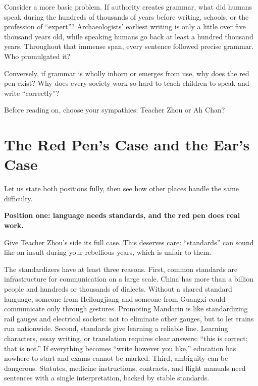 Consider a more basic problem. If authority creates grammar, what did humans speak during the hundreds of thousands of years before writing, schools, or the profession of ``expert''? Archaeologists' earliest writing is only a little over five thousand years old, while speaking humans go back at least a hundred thousand years. Throughout that immense span, every sentence followed precise grammar. Who promulgated it?

Conversely, if grammar is wholly inborn or emerges from use, why does the red pen exist? Why does every society work so hard to teach children to speak and write ``correctly''?

Before reading on, choose your sympathies: Teacher Zhou or Ah Chan?

\section{The Red Pen's Case and the Ear's Case}
Let us state both positions fully, then see how other places handle the same difficulty.

\textbf{Position one: language needs standards, and the red pen does real work.}

Give Teacher Zhou's side its full case. This deserves care: ``standards'' can sound like an insult during your rebellious years, which is unfair to them.

The standardizers have at least three reasons. First, common standards are infrastructure for communication on a large scale. China has more than a billion people and hundreds or thousands of dialects. Without a shared standard language, someone from Heilongjiang and someone from Guangxi could communicate only through gestures. Promoting Mandarin is like standardizing rail gauges and electrical sockets: not to eliminate other gauges, but to let trains run nationwide. Second, standards give learning a reliable line. Learning characters, essay writing, or translation requires clear answers: ``this is correct; that is not.'' If everything becomes ``write however you like,'' education has nowhere to start and exams cannot be marked. Third, ambiguity can be dangerous. Statutes, medicine instructions, contracts, and flight manuals need sentences with a single interpretation, backed by stable standards.

